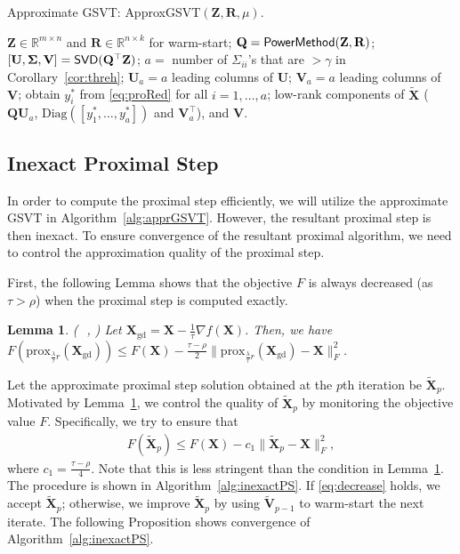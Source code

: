 \documentclass[10pt,journal,compsoc]{IEEEtran}
\newtheorem{lemma}[theorem]{Lemma}
\def \R{\mathbb R}
\newcommand{\X}{\mathbf{X}}
\newcommand{\NM}[2]{\| #1 \|_{#2} }
\newcommand{\Prox}[2]{\text{prox}_{#1}(#2)}
\newcommand{\Diag}[1]{\text{Diag}(#1)}
\begin{document}
\begin{algorithm}[ht]
\caption{Approximate GSVT: \textsf{ApproxGSVT}$(\mathbf{Z}, \mathbf{R}, \mu)$.}
\begin{algorithmic}[1]
	\REQUIRE $\mathbf{Z} \in \R^{m \times n}$ 
	and $\mathbf{R} \in \R^{n \times k}$ for warm-start;
	\STATE $\mathbf{Q} = \text{\sf PowerMethod}(\mathbf{Z}, \mathbf{R})$;
	\STATE $[ \mathbf{U}, \mathbf{\Sigma}, \mathbf{V} ] = \text{\sf SVD}(\mathbf{Q}^{\top} \mathbf{Z})$;
	\STATE $a = $ number of $\Sigma_{ii}$'s that are $>\gamma$
	in Corollary~\ref{cor:threh};
	\STATE $\mathbf{U}_a = a$ leading columns of $\mathbf{U}$;
	\STATE $\mathbf{V}_a = a$ leading columns of $\mathbf{V}$;
	\STATE obtain $y^*_i$ from \eqref{eq:proRed} for all $i = 1, \dots, a$;
	\RETURN  low-rank components of $\tilde{\mathbf{X}}$
	($\mathbf{Q} \mathbf{U}_a$, $\Diag{[ y_1^*,\dots,y_{a}^* ]}$ and $\mathbf{V}_a^{\top}$),
	and $\mathbf{V}$.
\end{algorithmic}
\label{alg:apprGSVT}
\end{algorithm}

\subsection{Inexact Proximal Step}
\label{sec:pstep}

In order to compute the proximal step efficiently,
we will utilize the approximate GSVT in Algorithm~\ref{alg:apprGSVT}.
However,
the resultant proximal step is then inexact.
To ensure convergence of the resultant proximal algorithm,
we need to control the approximation quality of the proximal step.

First,
the following Lemma shows that the objective $F$ is always decreased (as $\tau > \rho$)
when the proximal step is computed exactly.

\begin{lemma}
\label{lem:desc}
{\normalfont  ( $\!\!\!\!$ \cite{gongZLHY2013}, \cite{attouch2013convergence})}
Let $\X_{\text{gd}} = \mathbf{X} - \frac{1}{\tau} \nabla f(\mathbf{X})$.
Then, 
we have
$F( \Prox{\frac{\lambda}{\tau} r}{\X_{\text{gd}}} ) 
\le
F(\mathbf{X}) - \frac{\tau - \rho}{2} 
\NM{\Prox{\frac{\lambda}{\tau} r}{\X_{\text{gd}}} - \mathbf{X}}{F}^2$.
\end{lemma}

Let the approximate 
proximal step 
solution  obtained at the $p$th iteration 
be $\tilde{\X}_p$.
Motivated by 
Lemma~\ref{lem:desc},
we control the quality of $\tilde{\X}_p$ by monitoring the objective value $F$.
Specifically,
we try to ensure that
\begin{align}
F( \tilde{\mathbf{X}}_p )
\le F(\mathbf{X}) - c_1 \NM{\tilde{\mathbf{X}}_p - \mathbf{X}}{F}^2,
\label{eq:decrease}
\end{align} 
where $c_1 = \frac{\tau - \rho }{4}$.
Note that this is less stringent than the condition in Lemma~\ref{lem:desc}.
The procedure is shown in Algorithm~\ref{alg:inexactPS}.  
If \eqref{eq:decrease} holds, 
we accept $\tilde{\mathbf{X}}_p$;
otherwise, 
we improve $\tilde{\mathbf{X}}_p$ by using $\tilde{\mathbf{V}}_{p - 1}$ to warm-start the next iterate.
The following Proposition shows convergence of Algorithm~\ref{alg:inexactPS}.
\end{document}
